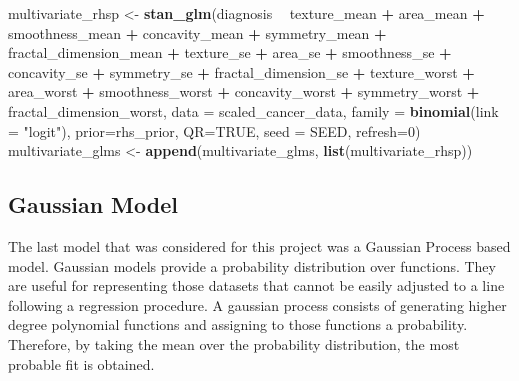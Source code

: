 \documentclass[
]{article}
\newenvironment{Shaded}{\begin{snugshade}}{\end{snugshade}}
\newcommand{\DataTypeTok}[1]{\textcolor[rgb]{0.13,0.29,0.53}{#1}}
\newcommand{\DecValTok}[1]{\textcolor[rgb]{0.00,0.00,0.81}{#1}}
\newcommand{\KeywordTok}[1]{\textcolor[rgb]{0.13,0.29,0.53}{\textbf{#1}}}
\newcommand{\NormalTok}[1]{#1}
\newcommand{\OperatorTok}[1]{\textcolor[rgb]{0.81,0.36,0.00}{\textbf{#1}}}
\newcommand{\OtherTok}[1]{\textcolor[rgb]{0.56,0.35,0.01}{#1}}
\newcommand{\StringTok}[1]{\textcolor[rgb]{0.31,0.60,0.02}{#1}}
\begin{document}
\begin{Shaded}
\begin{Highlighting}[]
\NormalTok{multivariate_rhsp <-}\StringTok{ }\KeywordTok{stan_glm}\NormalTok{(diagnosis }\OperatorTok{~}\StringTok{ }\NormalTok{texture_mean }\OperatorTok{+}\StringTok{ }\NormalTok{area_mean}
                              \OperatorTok{+}\StringTok{ }\NormalTok{smoothness_mean }\OperatorTok{+}\StringTok{ }\NormalTok{concavity_mean}
                              \OperatorTok{+}\StringTok{ }\NormalTok{symmetry_mean }\OperatorTok{+}\StringTok{ }\NormalTok{fractal_dimension_mean}
                              \OperatorTok{+}\StringTok{ }\NormalTok{texture_se }\OperatorTok{+}\StringTok{ }\NormalTok{area_se }\OperatorTok{+}\StringTok{ }\NormalTok{smoothness_se}
                              \OperatorTok{+}\StringTok{ }\NormalTok{concavity_se }\OperatorTok{+}\StringTok{ }\NormalTok{symmetry_se}
                              \OperatorTok{+}\StringTok{ }\NormalTok{fractal_dimension_se }\OperatorTok{+}\StringTok{ }\NormalTok{texture_worst}
                              \OperatorTok{+}\StringTok{ }\NormalTok{area_worst }\OperatorTok{+}\StringTok{ }\NormalTok{smoothness_worst }\OperatorTok{+}\StringTok{ }\NormalTok{concavity_worst}
                              \OperatorTok{+}\StringTok{ }\NormalTok{symmetry_worst }\OperatorTok{+}\StringTok{ }\NormalTok{fractal_dimension_worst,}
                              \DataTypeTok{data =}\NormalTok{ scaled_cancer_data,}
                              \DataTypeTok{family =} \KeywordTok{binomial}\NormalTok{(}\DataTypeTok{link =} \StringTok{"logit"}\NormalTok{),}
                              \DataTypeTok{prior=}\NormalTok{rhs_prior, }\DataTypeTok{QR=}\OtherTok{TRUE}\NormalTok{,}
                              \DataTypeTok{seed =}\NormalTok{ SEED, }\DataTypeTok{refresh=}\DecValTok{0}\NormalTok{)}
\NormalTok{multivariate_glms <-}\StringTok{ }\KeywordTok{append}\NormalTok{(multivariate_glms, }\KeywordTok{list}\NormalTok{(multivariate_rhsp))}
\end{Highlighting}
\end{Shaded}

\hypertarget{gaussian-model-1}{%
\subsection{Gaussian Model}\label{gaussian-model-1}}

The last model that was considered for this project was a Gaussian
Process based model. Gaussian models provide a probability distribution
over functions. They are useful for representing those datasets that
cannot be easily adjusted to a line following a regression procedure. A
gaussian process consists of generating higher degree polynomial
functions and assigning to those functions a probability. Therefore, by
taking the mean over the probability distribution, the most probable fit
is obtained.
\end{document}
